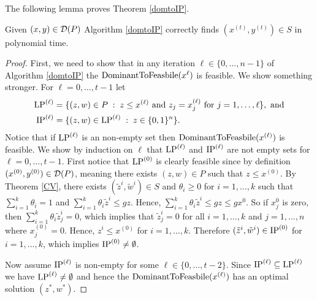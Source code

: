 The following lemma proves Theorem \ref{domtoIP}.
\begin{lemma}
	Given $(x,y)\in \operatorname{\mathcal{D}}(P)$ Algorithm \ref{domtoIP} correctly finds $(x^{(t)},y^{(t)})\in S$ in polynomial time.
\end{lemma}
\begin{proof}
	First, we need to show that in any iteration $\ell\in \{0,\ldots,n-1\}$ of Algorithm \ref{domtoIP} the $\operatorname{DominantToFeasbile}(x^{\ell})$ is feasible. We show something stronger. For $\ell=0,\ldots,t-1$ let
	\begin{align*}
	\operatorname{LP}^{(\ell)}&= \{(z,w)\in P\; : \; z\leq x^{(\ell)} \mbox{ and } z_j=x_j^{(\ell)} \mbox{ for } j=1,\ldots,\ell\}, \text{ and}\\
	\operatorname{IP}^{(\ell)}&= \{(z,w)\in \operatorname{LP}^{(\ell)}\; : \; z\in \{0,1\}^n\}.
	\end{align*}
	Notice that if $\operatorname{LP}^{(\ell)}$ is an non-empty set then $\operatorname{DominantToFeasbile}(x^{(\ell)})$ is feasible. We show by induction on $\ell$ that $\operatorname{LP}^{(\ell)}$ and $\operatorname{IP}^{(\ell)}$ are not empty sets for $\ell=0,\ldots,t-1$. First notice that $\operatorname{LP}^{(0)}$ is clearly feasible since by definition $(x^{(0)},y^{(0)})\in \operatorname{\mathcal{D}}(P)$, meaning there exists $(z,w)\in P$ such that $z\leq x^{(0)}$. By Theorem \ref{CV}, there exists $(\tilde{z}^i,\tilde{w}^i) \in S$ and $\theta_i\geq 0$ for $i=1,\ldots,k$ such that $\sum_{i=1}^{k} \theta_i = 1$ and $\sum_{i=1}^{k}\theta_i \tilde{z}^i \leq gz$. Hence, $\sum_{i=1}^{k}\theta_i \tilde{z}^i \leq gz\leq gx^0$. So if $x^0_j$ is zero, then $ \sum_{i=1}^{k}\theta_i \tilde{z}_j^i =0$, which implies that $\tilde{z}^i_j=0$ for all $i=1,\ldots,k$ and $j= 1,\ldots,n$ where $x^{(0)}_j=0$. Hence, $z^i\leq x^{(0)}$ for $i=1,\ldots,k$. Therefore $(\tilde{z}^i,\tilde{w}^i)\in \operatorname{IP}^{(0)}$ for $i=1,\ldots,k$, which implies $\operatorname{IP}^{(0)}\neq \emptyset$.
  
  Now assume $\operatorname{IP}^{(\ell)}$ is non-empty for some $\ell \in \{0,\ldots,t-2\}$. Since $\operatorname{IP}^{(\ell)}\subseteq\operatorname{LP}^{(\ell)}$ we have $\operatorname{LP}^{(\ell)}\neq \emptyset$ and hence the $\operatorname{DominantToFeasbile}(x^{(\ell)})$ has an optimal solution $(z^*,w^*)$. 
  

\end{proof}
